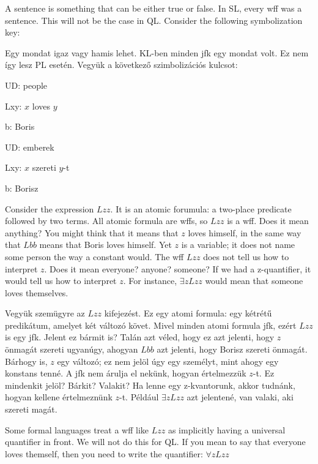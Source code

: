 A {sentence} is something that can be either true or false. In SL, every wff was a sentence. This will not be the case in QL. Consider the following symbolization key:

Egy mondat igaz vagy hamis lehet. KL-ben minden jfk egy mondat volt. Ez nem így lesz PL esetén. Vegyük a következő szimbolizációs kulcsot:

\begin{ekey}
\item[UD:] people
\item[Lxy:] $x$ loves $y$
\item[b:] Boris
\end{ekey}

\begin{ekey}
\item[UD:] emberek
\item[Lxy:] $x$ szereti $y$-t
\item[b:] Borisz
\end{ekey}

Consider the expression $Lzz$. It is an atomic forumula: a two-place predicate followed by two terms. All atomic formula are wffs, so $Lzz$ is a wff. Does it mean anything? You might think that it means that $z$ loves himself, in the same way that $Lbb$ means that Boris loves himself. Yet $z$ is a variable; it does not name some person the way a constant would. The wff $Lzz$ does not tell us how to interpret $z$. Does it mean everyone? anyone? someone? If we had a z-quantifier, it would tell us how to interpret $z$. For instance, $\exists zLzz$ would mean that someone loves themselves.

Vegyük szemügyre az $Lzz$ kifejezést. Ez egy atomi formula: egy kétrétű predikátum, amelyet két változó követ. Mivel minden atomi formula jfk, ezért $Lzz$ is egy jfk. Jelent ez bármit is? Talán azt véled, hogy ez azt jelenti, hogy $z$ önmagát szereti ugyanúgy, ahogyan $Lbb$ azt jelenti, hogy Borisz szereti önmagát. Bárhogy is, $z$ egy változó; ez nem jelöl úgy egy személyt, mint ahogy egy konstans tenné. A jfk nem árulja el nekünk, hogyan értelmezzük $z$-t. Ez mindenkit jelöl? Bárkit? Valakit? Ha lenne egy z-kvantorunk, akkor tudnánk, hogyan kellene értelmeznünk $z$-t. Például $\exists zLzz$ azt jelentené, van valaki, aki szereti magát.

Some formal languages treat a wff like $Lzz$ as implicitly having a universal quantifier in front. We will not do this for QL. If you mean to say that everyone loves themself, then you need to write the quantifier: $\forall zLzz$

